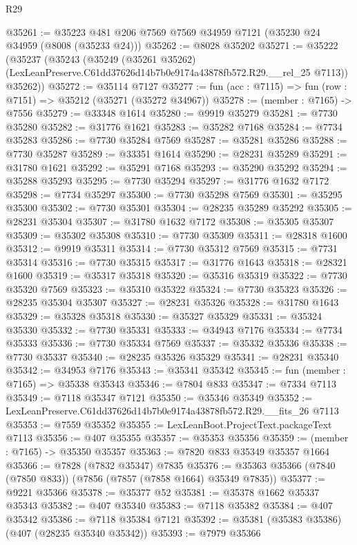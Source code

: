 \begin{lexlean}{R29}
\begin{coremodule}
@35261 := @35223 @481 @206 @7569 @7569 @34959 @7121 (@35230 @24 @34959 (@8008 (@35233 @24)))
@35262 := @8028 @35202
@35271 := @35222
    (@35237
      (@35243
        (@35249
          (@35261 @35262)
          (LexLeanPreserve.C61dd37626d14b7b0e9174a43878fb572.R29.__rel_25 @7113))
        @35262))
@35272 := @35114 @7127
@35277 := fun (acc : @7115) => fun (row : @7151) => @35212 (@35271 (@35272 @34967))
@35278 := (member : @7165) -> @7556
@35279 := @33348 @1614
@35280 := @9919 @35279
@35281 := @7730 @35280
@35282 := @31776 @1621
@35283 := @35282 @7168
@35284 := @7734 @35283
@35286 := @7730 @35284 @7569
@35287 := @35281 @35286
@35288 := @7730 @35287
@35289 := @33351 @1614
@35290 := @28231 @35289
@35291 := @31780 @1621
@35292 := @35291 @7168
@35293 := @35290 @35292
@35294 := @35288 @35293
@35295 := @7730 @35294
@35297 := @31776 @1632 @7172
@35298 := @7734 @35297
@35300 := @7730 @35298 @7569
@35301 := @35295 @35300
@35302 := @7730 @35301
@35304 := @28235 @35289 @35292
@35305 := @28231 @35304
@35307 := @31780 @1632 @7172
@35308 := @35305 @35307
@35309 := @35302 @35308
@35310 := @7730 @35309
@35311 := @28318 @1600
@35312 := @9919 @35311
@35314 := @7730 @35312 @7569
@35315 := @7731 @35314
@35316 := @7730 @35315
@35317 := @31776 @1643
@35318 := @28321 @1600
@35319 := @35317 @35318
@35320 := @35316 @35319
@35322 := @7730 @35320 @7569
@35323 := @35310 @35322
@35324 := @7730 @35323
@35326 := @28235 @35304 @35307
@35327 := @28231 @35326
@35328 := @31780 @1643
@35329 := @35328 @35318
@35330 := @35327 @35329
@35331 := @35324 @35330
@35332 := @7730 @35331
@35333 := @34943 @7176
@35334 := @7734 @35333
@35336 := @7730 @35334 @7569
@35337 := @35332 @35336
@35338 := @7730 @35337
@35340 := @28235 @35326 @35329
@35341 := @28231 @35340
@35342 := @34953 @7176
@35343 := @35341 @35342
@35345 := fun (member : @7165) => @35338 @35343
@35346 := @7804 @833
@35347 := @7334 @7113
@35349 := @7118 @35347 @7121
@35350 := @35346 @35349
@35352 := LexLeanPreserve.C61dd37626d14b7b0e9174a43878fb572.R29.__fits_26 @7113
@35353 := @7559 @35352
@35355 := LexLeanBoot.ProjectText.packageText @7113
@35356 := @407 @35355
@35357 := @35353 @35356
@35359 := (member : @7165) -> @35350 @35357
@35363 := @7820 @833 @35349 @35357 @1664
@35366 := @7828 (@7832 @35347) @7835
@35376 := @35363 @35366 (@7840 (@7850 @833)) (@7856 (@7857 (@7858 @1664) @35349 @7835))
@35377 := @9221 @35366
@35378 := @35377 @52
@35381 := @35378 @1662 @35337 @35343
@35382 := @407 @35340
@35383 := @7118 @35382
@35384 := @407 @35342
@35386 := @7118 @35384 @7121
@35392 := @35381 (@35383 @35386) (@407 (@28235 @35340 @35342))
@35393 := @7979 @35366

\end{coremodule}
\end{lexlean}

